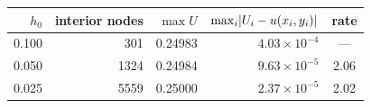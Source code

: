 \begin{tabular}{@{}rrrrc@{}}
\toprule
$h_0$ & interior nodes & $\max U$ & $\max_i\lvert U_i-u(x_i,y_i)\rvert$ & rate\\
\midrule
0.100 & 301 & 0.24983 & $4.03\!\times\!10^{-4}$ & ---\\
0.050 & 1324 & 0.24984 & $9.63\!\times\!10^{-5}$ & 2.06\\
0.025 & 5559 & 0.25000 & $2.37\!\times\!10^{-5}$ & 2.02\\
\bottomrule
\end{tabular}
